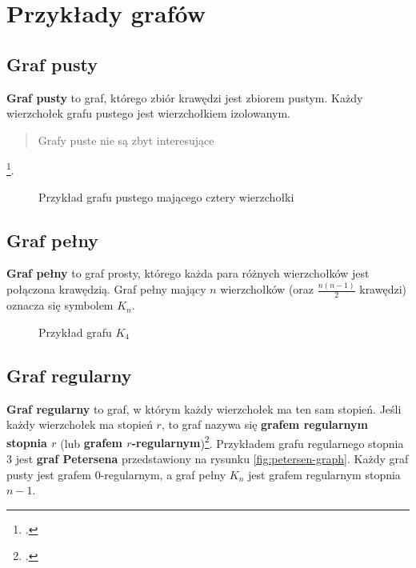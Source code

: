 \section{Przykłady grafów} \label{sec:common-graphs}

\subsection*{Graf pusty}

\textbf{Graf pusty} to graf, którego zbiór krawędzi jest zbiorem pustym. Każdy wierzchołek grafu pustego jest wierzchołkiem izolowanym. \blockquote{Grafy puste nie są zbyt interesujące}\footcite[30]{wilson}.

\begin{figure}[h]
\centering
{}
\captionsetup{justification=centering}
\caption{Przykład grafu pustego mającego cztery wierzchołki} \label{fig:empty-graph-example}
\end{figure}

\subsection*{Graf pełny}

\textbf{Graf pełny} to graf prosty, którego każda para różnych wierzchołków jest połączona krawędzią. Graf pełny mający $n$ wierzchołków (oraz $\frac{n(n-1)}{2}$ krawędzi) oznacza się symbolem $K_n$. 

\begin{figure}[h]
\centering
{}
\captionsetup{justification=centering}
\caption{Przykład grafu $K_4$} \label{fig:complete-graph-example}
\end{figure}

\subsection*{Graf regularny}

\textbf{Graf regularny} to graf, w którym każdy wierzchołek ma ten sam stopień. Jeśli każdy wierzchołek ma stopień $r$, to graf nazywa się \textbf{grafem regularnym stopnia $r$} (lub \textbf{grafem $r$-regularnym})\footcite[31]{wilson}. Przykładem grafu regularnego stopnia 3 jest \textbf{graf Petersena} przedstawiony na rysunku \ref{fig:petersen-graph}. Każdy graf pusty jest grafem $0$-regularnym, a graf pełny $K_n$ jest grafem regularnym stopnia $n-1$. 

